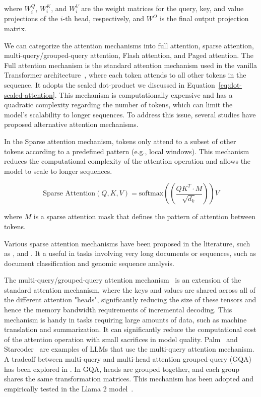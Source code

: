 \noindent where \(W_i^Q\), \(W_i^K\), and \(W_i^V\) are the weight matrices for the query, key, and value projections of the \(i\)-th head, respectively, and \(W^O\) is the final output projection matrix.

We can categorize the attention mechanisms into full attention, sparse attention, multi-query/grouped-query attention, Flash attention, and Paged attention.
The Full attention mechanism is the standard attention mechanism used in the vanilla Transformer architecture~\cite{vaswani2023attention}, where each token attends to all other tokens in the sequence.
It adopts the scaled dot-product we discussed in Equation~\ref{eq:dot-scaled-attention}.
This mechanism is computationally expensive and has a quadratic complexity regarding the number of tokens, which can limit the model's scalability to longer sequences.
To address this issue, several studies have proposed alternative attention mechanisms.

In the Sparse attention mechanism, tokens only attend to a subset of other tokens according to a predefined pattern (e.g., local windows).
This mechanism reduces the computational complexity of the attention operation and allows the model to scale to longer sequences.

\begin{equation}
	\text{Sparse Attention}(Q, K, V) = \text{softmax}((\frac{QK^T \cdotp M}{\sqrt{d_k}}))V
	\label{eq:sparse-attention}
\end{equation}

\noindent where \(M\) is a sparse attention mask that defines the pattern of attention between tokens.

Various sparse attention mechanisms have been proposed in the literature, such as \textcite{peng2021random}, \textcite{zaheer2020big} and \textcite{child2019generating}.
It a useful in tasks involving very long documents or sequences, such as document classification and genomic sequence analysis.

The multi-query/grouped-query attention mechanism~\cite{shazeer2019fast} is an extension of the standard attention mechanism, where the keys and values are shared across all of the different attention "heads", significantly reducing the size of these tensors and hence the memory bandwidth requirements of incremental decoding.
This mechanism is handy in tasks requiring large amounts of data, such as machine translation and summarization.
It can significantly reduce the computational cost of the attention operation with small sacrifices in model quality.
Palm~\cite{chowdhery2022palm} and Starcoder~\cite{li2023starcoder} are examples of LLMs that use the multi-query attention mechanism.
A tradeoff between multi-query and multi-head attention grouped-query (GQA) has been explored in \textcite{ainslie2023gqa}.
In GQA, heads are grouped together, and each group shares the same transformation matrices.
This mechanism has been adopted and empirically tested in the Llama 2 model~\cite{touvron2023llama2}.

